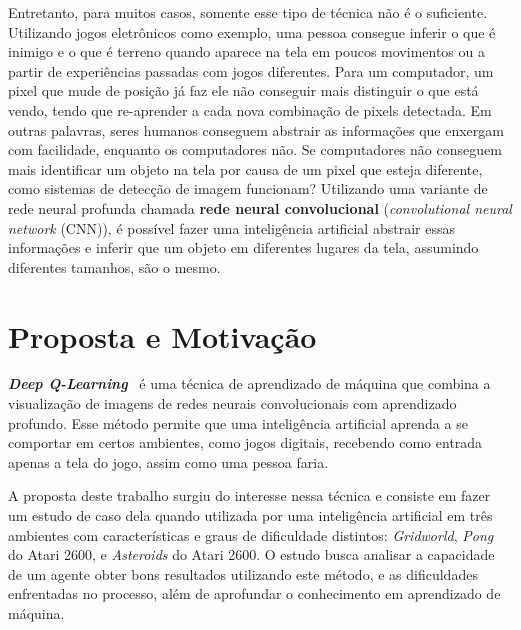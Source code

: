 Entretanto, para muitos casos, somente esse tipo de técnica não é o suficiente.
Utilizando jogos eletrônicos como exemplo, uma pessoa consegue inferir o que é inimigo e o que é terreno quando aparece na tela em poucos movimentos ou a partir de experiências passadas com jogos diferentes.
Para um computador, um pixel que mude de posição já faz ele não conseguir mais distinguir o que está vendo, tendo que re-aprender a cada nova combinação de pixels detectada.
Em outras palavras, seres humanos conseguem abstrair as informações que enxergam com facilidade, enquanto os computadores não.
Se computadores não conseguem mais identificar um objeto na tela por causa de um pixel que esteja diferente, como sistemas de detecção de imagem funcionam?
Utilizando uma variante de rede neural profunda chamada \textbf{rede neural convolucional} (\textit{convolutional neural network} (CNN)), é possível fazer uma inteligência artificial abstrair essas informações e inferir que um objeto em diferentes lugares da tela, assumindo diferentes tamanhos, são o mesmo.

\section{Proposta e Motivação}
\label{sec:motivacao_proposta}

\textbf{\textit{Deep Q-Learning}}~\cite{DBLP:journals/corr/MnihKSGAWR13} é uma técnica de aprendizado de máquina que combina a visualização de imagens de redes neurais convolucionais com aprendizado profundo.
Esse método permite que uma inteligência artificial aprenda a se comportar em certos ambientes, como jogos digitais, recebendo como entrada apenas a tela do jogo, assim como uma pessoa faria.

A proposta deste trabalho surgiu do interesse nessa técnica e consiste em fazer um estudo de caso dela quando utilizada por uma inteligência artificial em três ambientes com características e graus de dificuldade distintos: \textit{Gridworld}, \textit{Pong} do Atari 2600, e \textit{Asteroids} do Atari 2600.
O estudo busca analisar a capacidade de um agente obter bons resultados utilizando este método, e as dificuldades enfrentadas no processo, além de aprofundar o conhecimento em aprendizado de máquina.

